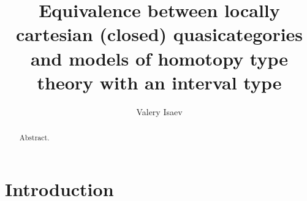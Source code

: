 \documentclass[reqno]{amsart}
\theoremstyle{definition}
\theoremstyle{remark}
\numberwithin{figure}{section}
\begin{document}
\title[Equivalence between quasicategories and models of type theory]{Equivalence between locally cartesian (closed) quasicategories and models of homotopy type theory with an interval type}

\author{Valery Isaev}

\begin{abstract}
Abstract.
\end{abstract}

\maketitle

\section{Introduction}
\end{document}
